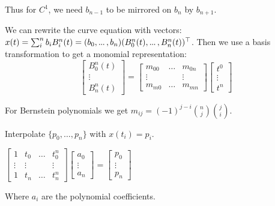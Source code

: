\begin{theorem}
  Thus for \(C^1\), we need \(b_{n-1}\) to be mirrored on \(b_n\) by \(b_{n+1}\).
\end{theorem}

\begin{definition}
  We can rewrite the curve equation with vectors:
  \(x(t) = \sum_i^n b_i B_i^n(t) = (b_0, \sdots, b_n)(B_0^n(t), \sdots, B_n^n(t))^\top\).
  Then we use a basis transformation to get a monomial representation:
  \[\begin{bmatrix}
    B_0^n(t) \\ \vdots \\ B_n^n(t)
  \end{bmatrix} = \begin{bmatrix}
    m_{00} & \ldots & m_{0n} \\ \vdots & & \vdots \\ m_{m0} & \ldots & m_{mn}
  \end{bmatrix} \begin{bmatrix}
    t^0 \\ \vdots \\ t^n
  \end{bmatrix}\]
\end{definition}

\begin{theorem}
  For Bernstein polynomials we get  \(m_{ij} = (-1)^{j-i}\binom{n}{j} \binom{j}{i}\).
\end{theorem}

\begin{definition}
  Interpolate \(\{p_0, \ldots, p_n\}\) with \(x(t_i) = p_i\).
  
  \begin{center}
    \(\begin{bmatrix}
      1 & t_0 & \ldots & t_0^n \\ \vdots & \vdots & & \vdots \\ 1 & t_n & \ldots & t_n^n
    \end{bmatrix} \begin{bmatrix}
      a_0 \\ \vdots \\ a_n
    \end{bmatrix} = \begin{bmatrix}
      p_0 \\ \vdots \\p_n
    \end{bmatrix}\)
  \end{center}

  Where \(a_i\) are the polynomial coefficients.
\end{definition}

